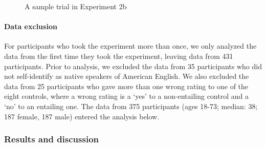 \documentclass[11pt,fleqn]{article}
\newcommand{\6}{\mbox{$[\hspace*{-.6mm}[$}}
\newcommand{\9}{\mbox{$]\hspace*{-.6mm}]$}}
\begin{document}
\begin{figure}[h!]
\begin{center}
\end{center}
\caption{A sample trial in Experiment 2b}\label{fig-trial-exp2b}
\end{figure}


\paragraph{Data exclusion} For participants who took the experiment more than once, we only analyzed the data from the first time they took the experiment, leaving data from 431 participants. Prior to analysis, we excluded the data from 35 participants who did not self-identify as native speakers of American English. We also excluded the data from 25 participants who gave more than one wrong rating to one of the eight controls, where a wrong rating is a `yes' to a non-entailing control and a `no' to an entailing one. The data from 375 participants (ages 18-73; median: 38; 187 female, 187 male) entered the analysis below. 
    

\subsubsection{Results and discussion}
\end{document}
